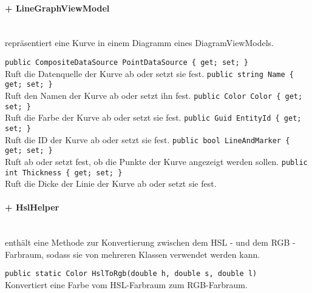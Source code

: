 \paragraph{+ LineGraphViewModel}~\\
 repräsentiert eine Kurve in einem Diagramm eines DiagramViewModels.
\begin{itemize}
	\add \verb!public CompositeDataSource PointDataSource { get; set; }! \\
	Ruft die Datenquelle der Kurve ab oder setzt sie fest.
	\add \verb!public string Name { get; set; }! \\
	Ruft den Namen der Kurve ab oder setzt ihn fest.
	\add \verb!public Color Color { get; set; }! \\
	Ruft die Farbe der Kurve ab oder setzt sie fest.
	\add \verb!public Guid EntityId { get; set; }! \\
	Ruft die ID der Kurve ab oder setzt sie fest.
	\add \verb!public bool LineAndMarker { get; set; }! \\
	Ruft ab oder setzt fest, ob die Punkte der Kurve angezeigt werden sollen.
	\add \verb!public int Thickness { get; set; }! \\
	Ruft die Dicke der Linie der Kurve ab oder setzt sie fest.
\end{itemize}

\paragraph{+ HslHelper}~\\
 enthält eine Methode zur Konvertierung zwischen dem HSL - und dem RGB - Farbraum, sodass sie von mehreren Klassen verwendet werden kann.
\begin{itemize}
	\add \verb!public static Color HslToRgb(double h, double s, double l)! \\
	Konvertiert eine Farbe vom HSL-Farbraum zum RGB-Farbraum.
\end{itemize}

\subsection{}
